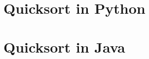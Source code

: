 \chapter{Quicksort in Python}

\label{quicksort:pyton}
\chapter{Quicksort in Java}
\label{quicksort:java}

